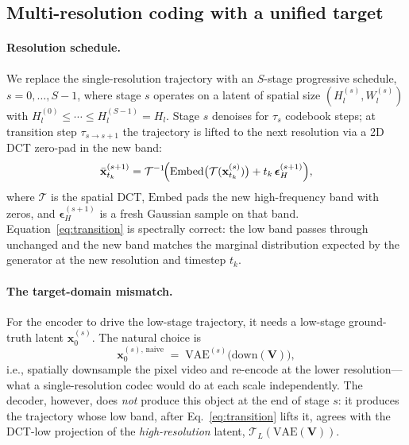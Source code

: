 \subsection{Multi-resolution coding with a unified target}
\label{sec:method-mr}

\paragraph{Resolution schedule.}
We replace the single-resolution trajectory with an $S$-stage progressive
schedule, $s\!=\!0,\ldots,S\!-\!1$, where stage $s$ operates on a latent of
spatial size $(H_l^{(s)}, W_l^{(s)})$ with
$H_l^{(0)} \!\le\! \cdots \!\le\! H_l^{(S-1)} \!=\! H_l$. Stage $s$
denoises for $\tau_s$ codebook steps; at transition step $\tau_{s\to s+1}$
the trajectory is lifted to the next resolution via a 2D DCT zero-pad in
the new band:
\begin{equation}
\bar{\mathbf{x}}^{(s+1)}_{t_k} = \mathcal{T}^{-1}\!\Bigl(
\text{Embed}\bigl(\mathcal{T}(\mathbf{x}^{(s)}_{t_k})\bigr) + t_k\,\boldsymbol{\epsilon}^{(s+1)}_H
\Bigr),
\label{eq:transition}
\end{equation}
where $\mathcal{T}$ is the spatial DCT, $\text{Embed}$ pads the new
high-frequency band with zeros, and $\boldsymbol{\epsilon}^{(s+1)}_H$ is a
fresh Gaussian sample on that band. Equation~\ref{eq:transition} is
spectrally correct: the low band passes through unchanged and the new band
matches the marginal distribution expected by the generator at the new
resolution and timestep $t_k$.

\paragraph{The target-domain mismatch.}
For the encoder to drive the low-stage trajectory, it needs a low-stage
ground-truth latent $\mathbf{x}_0^{(s)}$. The natural choice is
\begin{equation}
\mathbf{x}_0^{(s),\,\text{naive}} \;=\; \mathrm{VAE}^{(s)}\bigl(\mathrm{down}(\mathbf{V})\bigr),
\label{eq:naive-target}
\end{equation}
i.e., spatially downsample the pixel video and re-encode at the lower
resolution---what a single-resolution codec would do at each scale
independently. The decoder, however, does \emph{not} produce this object
at the end of stage $s$: it produces the trajectory whose low band, after
Eq.~\ref{eq:transition} lifts it, agrees with the DCT-low projection of
the \emph{high-resolution} latent,
$\mathcal{T}_L(\mathrm{VAE}(\mathbf{V}))$.

